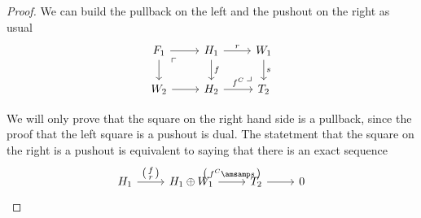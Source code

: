 \begin{proof}
  We can build the pullback on the left and the pushout on the right as usual
  \begin{equation}\label{lem12:eq1}
    \begin{tikzcd}
      F_1\arrow{r}\arrow{d}\arrow[phantom,"\ulcorner",very near start]{dr}
        & H_1\arrow{r}{r}\arrow{d}{f}\arrow[phantom,"\lrcorner",very near end]{dr}
          & W_1\arrow{d}{s}\\
      W_2\arrow{r}
        & H_2\arrow{r}{f^C}
          & T_2
    \end{tikzcd}
  \end{equation}

  We will only prove that the square on the right hand side is a pullback, since the proof
  that the left square is a pushout is dual. The statetment that the square on the right is
  a pushout is equivalent to saying that there is an exact sequence
  \begin{equation}\label{lem12:eq2}
    \begin{tikzcd}
      H_1\arrow{r}{
        \begin{psmallmatrix}
          f \\ r
        \end{psmallmatrix}
      }
        & H_1\oplus W_1 \arrow{r}{
          \begin{psmallmatrix}
            f^C \amsamp s
          \end{psmallmatrix}
        }
          & T_2\arrow{r}
            & 0
    \end{tikzcd}
  \end{equation}


\end{proof}

